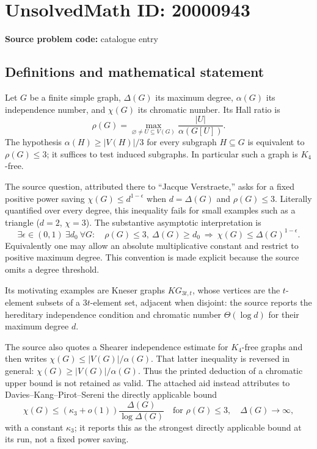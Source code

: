 \documentclass[11pt]{article}
\begin{document}
\section*{UnsolvedMath ID: 20000943}
\textbf{Source problem code:} catalogue entry
\subsection{Definitions and mathematical statement}
Let $G$ be a finite simple graph, $\Delta(G)$ its maximum degree, $\alpha(G)$ its independence number, and $\chi(G)$ its chromatic number. Its Hall ratio is
\[
 \rho(G)=\max_{\varnothing\ne U\subseteq V(G)}\frac{|U|}{\alpha(G[U])}.
\]
The hypothesis $\alpha(H)\geq|V(H)|/3$ for every subgraph $H\subseteq G$ is equivalent to $\rho(G)\leq3$; it suffices to test induced subgraphs. In particular such a graph is $K_4$-free.

The source question, attributed there to ``Jacque Verstraete,'' asks for a fixed positive power saving $\chi(G)\leq d^{1-\epsilon}$ when $d=\Delta(G)$ and $\rho(G)\leq3$. Literally quantified over every degree, this inequality fails for small examples such as a triangle ($d=2$, $\chi=3$). The substantive asymptotic interpretation is
\[
 \exists\epsilon\in(0,1)\ \exists d_0\ \forall G:\quad
 \rho(G)\leq3,\ \Delta(G)\geq d_0
 \ \Longrightarrow\ \chi(G)\leq\Delta(G)^{1-\epsilon}.
\]
Equivalently one may allow an absolute multiplicative constant and restrict to positive maximum degree. This convention is made explicit because the source omits a degree threshold.

Its motivating examples are Kneser graphs $KG_{3t,t}$, whose vertices are the $t$-element subsets of a $3t$-element set, adjacent when disjoint: the source reports the hereditary independence condition and chromatic number $\Theta(\log d)$ for their maximum degree $d$.

The source also quotes a Shearer independence estimate for $K_4$-free graphs and then writes $\chi(G)\leq |V(G)|/\alpha(G)$. That latter inequality is reversed in general: $\chi(G)\geq |V(G)|/\alpha(G)$. Thus the printed deduction of a chromatic upper bound is not retained as valid. The attached aid instead attributes to Davies--Kang--Pirot--Sereni the directly applicable bound
\[
 \chi(G)\leq(\kappa_3+o(1))\frac{\Delta(G)}{\log\Delta(G)}
 \quad\text{for }\rho(G)\leq3,\quad\Delta(G)\to\infty,
\]
with a constant $\kappa_3$; it reports this as the strongest directly applicable bound at its run, not a fixed power saving.
\end{document}
